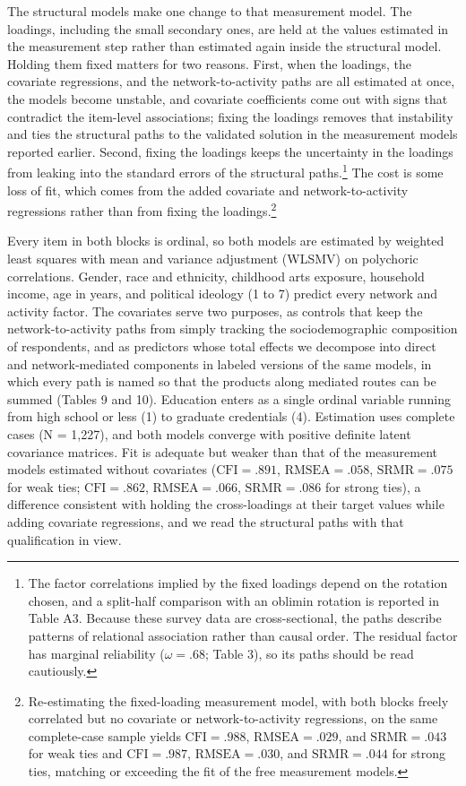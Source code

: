 \documentclass[
  12pt
]{article}
\begin{document}
The structural models make one change to that measurement model. The loadings, including the small secondary ones, are held at the values estimated in the measurement step rather than estimated again inside the structural model. Holding them fixed matters for two reasons. First, when the loadings, the covariate regressions, and the network-to-activity paths are all estimated at once, the models become unstable, and covariate coefficients come out with signs that contradict the item-level associations; fixing the loadings removes that instability and ties the structural paths to the validated solution in the measurement models reported earlier. Second, fixing the loadings keeps the uncertainty in the loadings from leaking into the standard errors of the structural paths.\footnote{The factor correlations implied by the fixed loadings depend on the rotation chosen, and a split-half comparison with an oblimin rotation is reported in Table A3. Because these survey data are cross-sectional, the paths describe patterns of relational association rather than causal order. The residual factor has marginal reliability ($\omega = .68$; Table 3), so its paths should be read cautiously.} The cost is some loss of fit, which comes from the added covariate and network-to-activity regressions rather than from fixing the loadings.\footnote{Re-estimating the fixed-loading measurement model, with both blocks freely correlated but no covariate or network-to-activity regressions, on the same complete-case sample yields $\text{CFI} = .988$, $\text{RMSEA} = .029$, and $\text{SRMR} = .043$ for weak ties and $\text{CFI} = .987$, $\text{RMSEA} = .030$, and $\text{SRMR} = .044$ for strong ties, matching or exceeding the fit of the free measurement models.}

Every item in both blocks is ordinal, so both models are estimated by weighted least squares with mean and variance adjustment (WLSMV) on polychoric correlations. Gender, race and ethnicity, childhood arts exposure, household income, age in years, and political ideology (1 to 7) predict every network and activity factor. The covariates serve two purposes, as controls that keep the network-to-activity paths from simply tracking the sociodemographic composition of respondents, and as predictors whose total effects we decompose into direct and network-mediated components in labeled versions of the same models, in which every path is named so that the products along mediated routes can be summed (Tables 9 and 10). Education enters as a single ordinal variable running from high school or less (1) to graduate credentials (4). Estimation uses complete cases (N = 1,227), and both models converge with positive definite latent covariance matrices. Fit is adequate but weaker than that of the measurement models estimated without covariates ($\text{CFI} = .891$, $\text{RMSEA} = .058$, $\text{SRMR} = .075$ for weak ties; $\text{CFI} = .862$, $\text{RMSEA} = .066$, $\text{SRMR} = .086$ for strong ties), a difference consistent with holding the cross-loadings at their target values while adding covariate regressions, and we read the structural paths with that qualification in view.
\end{document}
